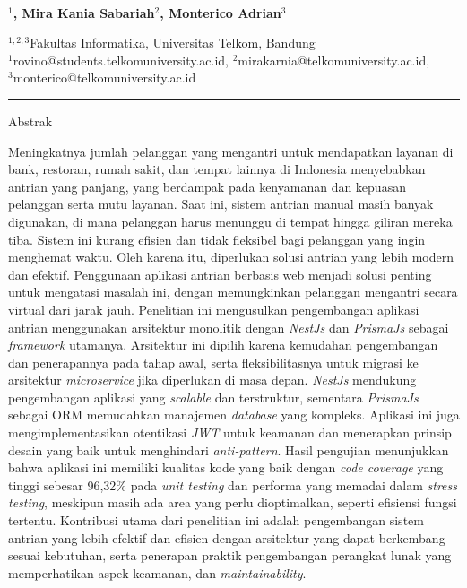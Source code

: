 
  \begin{center}
      \textbf{\large \Title}\\
      \bigskip 
  \end{center}
  
  
  
  \begin{center}
    \bf \Author$^1$, Mira Kania Sabariah$^2$, Monterico Adrian$^3$
  \end{center}
  
  
  \begin{center}
    $^{1,2,3}$Fakultas Informatika, Universitas Telkom, Bandung\\
$^1$rovino@students.telkomuniversity.ac.id, $^2$mirakarnia@telkomuniversity.ac.id,\\ $^3$monterico@telkomuniversity.ac.id
  \end{center}
  
  
  
{\bf \parindent0pt \noindent\rule{\textwidth}{1pt}}
Abstrak

Meningkatnya jumlah pelanggan yang mengantri untuk mendapatkan layanan di bank, restoran, rumah sakit, dan tempat lainnya di Indonesia menyebabkan antrian yang panjang, yang berdampak pada kenyamanan dan kepuasan pelanggan serta mutu layanan. Saat ini, sistem antrian manual masih banyak digunakan, di mana pelanggan harus menunggu di tempat hingga giliran mereka tiba. Sistem ini kurang efisien dan tidak fleksibel bagi pelanggan yang ingin menghemat waktu. Oleh karena itu, diperlukan solusi antrian yang lebih modern dan efektif. Penggunaan aplikasi antrian berbasis web menjadi solusi penting untuk mengatasi masalah ini, dengan memungkinkan pelanggan mengantri secara virtual dari jarak jauh. Penelitian ini mengusulkan pengembangan aplikasi antrian menggunakan arsitektur monolitik dengan \textit{NestJs} dan \textit{PrismaJs} sebagai \textit{framework} utamanya. Arsitektur ini dipilih karena kemudahan pengembangan dan penerapannya pada tahap awal, serta fleksibilitasnya untuk migrasi ke arsitektur \textit{microservice} jika diperlukan di masa depan. \textit{NestJs} mendukung pengembangan aplikasi yang \textit{scalable} dan terstruktur, sementara \textit{PrismaJs} sebagai ORM memudahkan manajemen \textit{database} yang kompleks. Aplikasi ini juga mengimplementasikan otentikasi \textit{JWT} untuk keamanan dan menerapkan prinsip desain yang baik untuk menghindari \textit{anti-pattern}. Hasil pengujian menunjukkan bahwa aplikasi ini memiliki kualitas kode yang baik dengan \textit{code coverage} yang tinggi sebesar 96,32\% pada \textit{unit testing} dan performa yang memadai dalam \textit{stress testing}, meskipun masih ada area yang perlu dioptimalkan, seperti efisiensi fungsi tertentu. Kontribusi utama dari penelitian ini adalah pengembangan sistem antrian yang lebih efektif dan efisien dengan arsitektur yang dapat berkembang sesuai kebutuhan, serta penerapan praktik pengembangan perangkat lunak yang memperhatikan aspek keamanan, dan \textit{maintainability}.

